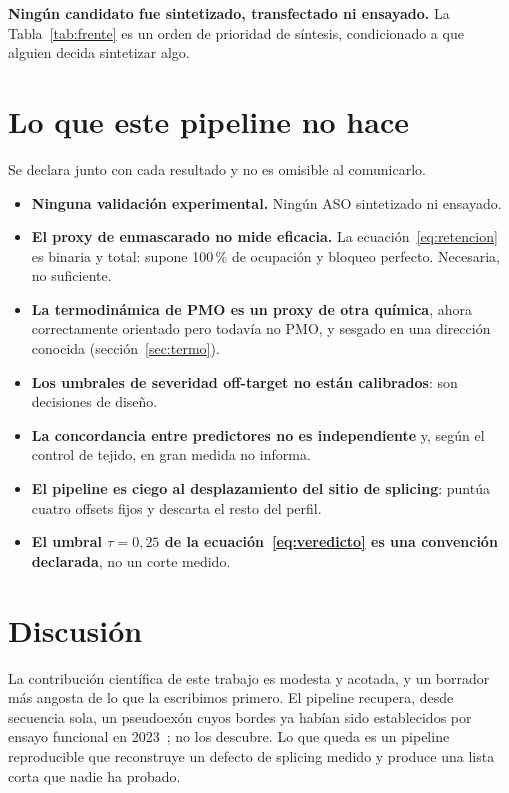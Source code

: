 \documentclass[11pt,a4paper]{article}
\begin{document}
\textbf{Ningún candidato fue sintetizado, transfectado ni ensayado.} La Tabla~\ref{tab:frente} es un
orden de prioridad de síntesis, condicionado a que alguien decida sintetizar algo.

\section{Lo que este pipeline no hace}

Se declara junto con cada resultado y no es omisible al comunicarlo.

\begin{itemize}[nosep, leftmargin=1.4em]
  \item \textbf{Ninguna validación experimental.} Ningún ASO sintetizado ni ensayado.
  \item \textbf{El proxy de enmascarado no mide eficacia.} La ecuación~\ref{eq:retencion} es binaria
        y total: supone 100\,\% de ocupación y bloqueo perfecto. Necesaria, no suficiente.
  \item \textbf{La termodinámica de PMO es un proxy de otra química}, ahora correctamente orientado
        pero todavía no PMO, y sesgado en una dirección conocida (sección~\ref{sec:termo}).
  \item \textbf{Los umbrales de severidad off-target no están calibrados}: son decisiones de diseño.
  \item \textbf{La concordancia entre predictores no es independiente} y, según el control de tejido,
        en gran medida no informa.
  \item \textbf{El pipeline es ciego al desplazamiento del sitio de splicing}: puntúa cuatro offsets
        fijos y descarta el resto del perfil.
  \item \textbf{El umbral $\tau = 0{,}25$ de la ecuación~\ref{eq:veredicto} es una convención
        declarada}, no un corte medido.
\end{itemize}

\section{Discusión}

La contribución científica de este trabajo es modesta y acotada, y un borrador más angosta de lo que
la escribimos primero. El pipeline recupera, desde secuencia sola, un pseudoexón cuyos bordes ya
habían sido establecidos por ensayo funcional en 2023~\cite{corradi2023}; no los descubre. Lo que
queda es un pipeline reproducible que reconstruye un defecto de splicing medido y produce una lista
corta que nadie ha probado.
\end{document}
